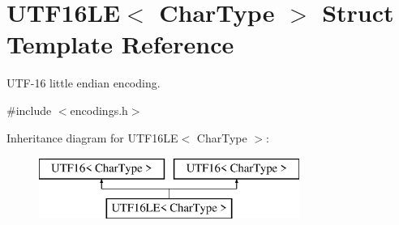 \hypertarget{struct_u_t_f16_l_e}{}\section{U\+T\+F16\+LE$<$ Char\+Type $>$ Struct Template Reference}
\label{struct_u_t_f16_l_e}


U\+T\+F-\/16 little endian encoding.  




{\ttfamily \#include $<$encodings.\+h$>$}

Inheritance diagram for U\+T\+F16\+LE$<$ Char\+Type $>$\+:\begin{figure}[H]
\begin{center}
\leavevmode
\includegraphics[height=2.000000cm]{struct_u_t_f16_l_e}
\end{center}
\end{figure}
